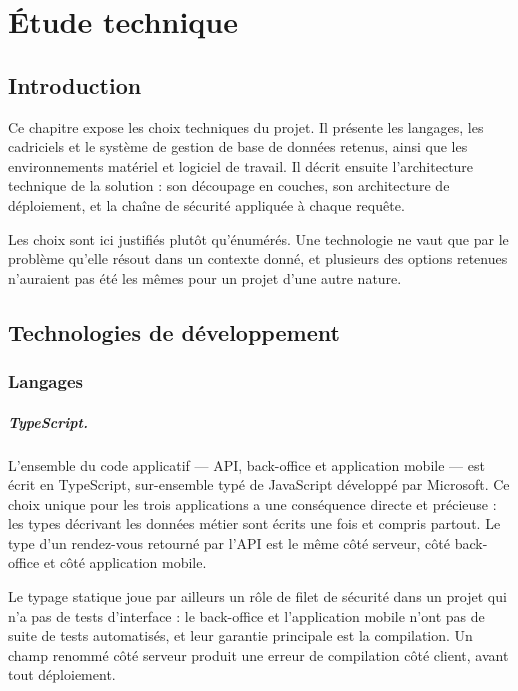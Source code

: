 \chapter{Étude technique}

\section*{Introduction}

Ce chapitre expose les choix techniques du projet. Il présente les langages,
les cadriciels et le système de gestion de base de données retenus, ainsi que
les environnements matériel et logiciel de travail. Il décrit ensuite
l'architecture technique de la solution : son découpage en couches, son
architecture de déploiement, et la chaîne de sécurité appliquée à chaque
requête.

Les choix sont ici justifiés plutôt qu'énumérés. Une technologie ne vaut que
par le problème qu'elle résout dans un contexte donné, et plusieurs des options
retenues n'auraient pas été les mêmes pour un projet d'une autre nature.

\section{Technologies de développement}

\subsection{Langages}

\paragraph{TypeScript.} L'ensemble du code applicatif --- API, back-office et
application mobile --- est écrit en TypeScript, sur-ensemble typé de
JavaScript développé par Microsoft. Ce choix unique pour les trois applications
a une conséquence directe et précieuse : les types décrivant les données
métier sont écrits une fois et compris partout. Le type d'un rendez-vous
retourné par l'API est le même côté serveur, côté back-office et côté
application mobile.

Le typage statique joue par ailleurs un rôle de filet de sécurité dans un
projet qui n'a pas de tests d'interface : le back-office et l'application
mobile n'ont pas de suite de tests automatisés, et leur garantie principale est
la compilation. Un champ renommé côté serveur produit une erreur de compilation
côté client, avant tout déploiement.

